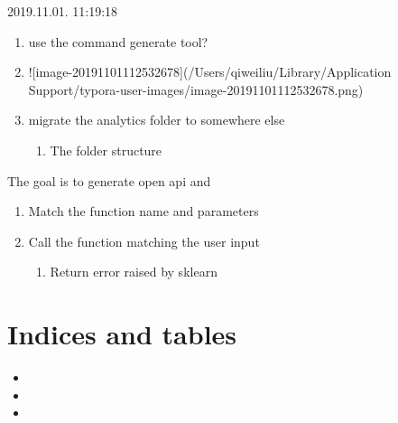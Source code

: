 \documentclass[letterpaper,10pt,english]{sphinxmanual}
\begin{document}
2019.11.01. 11:19:18
\begin{enumerate}
%
\item {} 
use the command generate tool?

\item {} 
!{[}image-20191101112532678{]}(/Users/qiweiliu/Library/Application Support/typora-user-images/image-20191101112532678.png)

\item {} 
migrate the analytics folder to somewhere else
\begin{enumerate}
%
\item {} 
The folder structure

\end{enumerate}

\end{enumerate}

The goal is to generate open api and

\begin{sphinxVerbatim}[commandchars=\\\{\}]
       
\end{sphinxVerbatim}
\begin{enumerate}
%
\item {} 
Match the function name and parameters

\item {} 
Call the function matching the user input
\begin{enumerate}
%
\item {} 
Return error raised by sklearn

\end{enumerate}

\end{enumerate}


\chapter{Indices and tables}
\label{\detokenize{index:indices-and-tables}}\begin{itemize}
\item {} 

\item {} 

\item {} 

\end{itemize}
\end{document}
